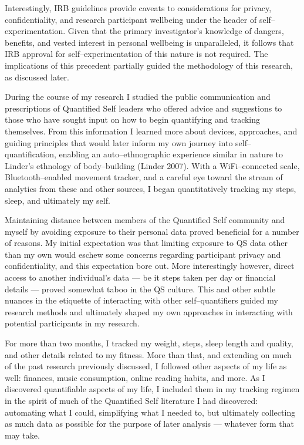 \documentclass{article}
\begin{document}
Interestingly,
IRB guidelines provide caveats to considerations for privacy,
confidentiality,
and research participant wellbeing under the header of self--experimentation.
Given that the primary investigator's knowledge of dangers,
benefits,
and vested interest in personal wellbeing is unparalleled,
it follows that IRB approval for self--experimentation of this nature is not required.
The implications of this precedent partially guided the methodology of this research,
as discussed later.

During the course of my research I studied the public communication and prescriptions of Quantified Self leaders who offered advice and suggestions to those who have sought input on how to begin quantifying and tracking themselves.
From this information I learned more about devices,
approaches,
and guiding principles that would later inform my own journey into self--quantification,
enabling an auto--ethnographic experience similar in nature to Linder's ethnology of body--building
(Linder 2007).
With a WiFi--connected scale,
Bluetooth--enabled movement tracker,
and a careful eye toward the stream of analytics from these and other sources,
I began quantitatively tracking my steps,
sleep,
and ultimately my self.

Maintaining distance between members of the Quantified Self community and myself by avoiding exposure to their personal data proved beneficial for a number of reasons.
My initial expectation was that limiting exposure to QS data other than my own would eschew some concerns regarding participant privacy and confidentiality,
and this expectation bore out.
More interestingly however,
direct access to another individual's data
--- be it steps taken per day or financial details ---
proved somewhat taboo in the QS culture.
This and other subtle nuances in the etiquette of interacting with other self--quantifiers guided my research methods and ultimately shaped my own approaches in interacting with potential participants in my research.

For more than two months,
I tracked my weight,
steps,
sleep length and quality,
and other details related to my fitness.
More than that,
and extending on much of the past research previously discussed,
I followed other aspects of my life as well:
finances,
music consumption,
online reading habits,
and more.
As I discovered quantifiable aspects of my life,
I included them in my tracking regimen in the spirit of much of the Quantified Self literature I had discovered:
automating what I could,
simplifying what I needed to,
but ultimately collecting as much data as possible for the purpose of later analysis
--- whatever form that may take.
\end{document}
